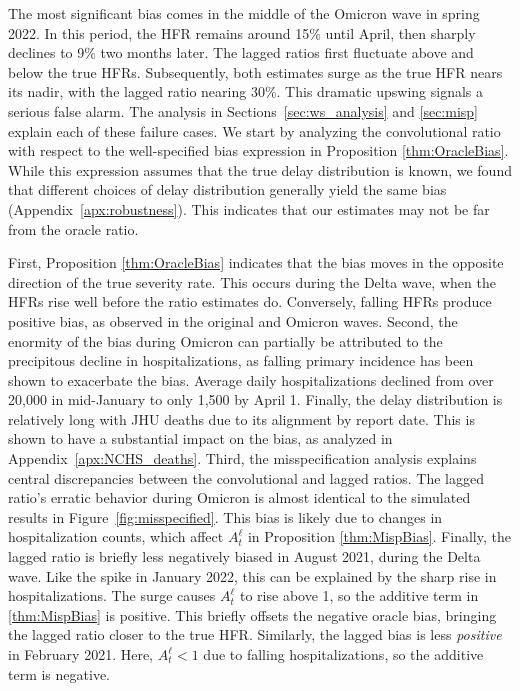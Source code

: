 \documentclass{article}
\begin{document}
The most significant bias comes in the middle of the Omicron wave in spring 2022. 
In this period, the HFR remains around 15\% until April, then sharply declines to 9\% two months later. The lagged ratios first fluctuate above and below the true HFRs. Subsequently, both estimates surge as the true HFR nears its nadir, with the lagged ratio nearing 30\%. This dramatic upswing signals a serious false alarm. 
The analysis in Sections~\ref{sec:ws_analysis} and \ref{sec:misp} explain each
of these failure cases. We start by analyzing the convolutional ratio with
respect to the well-specified bias expression in Proposition \ref{thm:OracleBias}.
While this expression assumes that the true delay distribution is known, we found
that different choices of delay distribution generally yield the same bias
(Appendix~\ref{apx:robustness}). This indicates that our estimates may not be far
from the oracle ratio.

First, Proposition \ref{thm:OracleBias} indicates that the bias moves in the opposite direction of the true severity rate. This occurs during the Delta wave, when the HFRs rise well before the ratio estimates do. Conversely, falling HFRs produce positive bias, as observed in the original and Omicron waves.
Second, the enormity of the bias during Omicron can partially be attributed to the precipitous decline in hospitalizations, as falling primary incidence has been shown to exacerbate the bias. Average daily hospitalizations declined from over 20,000 in mid-January to only 1,500 by April 1. 
Finally, the delay distribution is relatively long with JHU deaths due to its alignment by report date. This is shown to have a substantial impact on the bias, as analyzed in Appendix~\ref{apx:NCHS_deaths}.
Third, the misspecification analysis explains central discrepancies between the
convolutional and lagged ratios. The lagged ratio's erratic behavior during
Omicron is almost identical to the simulated results in
Figure~\ref{fig:misspecified}. This bias is likely due to changes in
hospitalization counts, which affect $A_t^\ell$ in Proposition \ref{thm:MispBias}.
Finally, the lagged ratio is briefly less negatively biased in August 2021, during the Delta wave. Like the spike in January 2022, this can be explained by the sharp rise in hospitalizations. The surge causes $A_t^\ell$ to rise above 1, so the additive term in \ref{thm:MispBias} is positive. This briefly offsets the negative oracle bias, bringing the lagged ratio closer to the true HFR. Similarly, the lagged bias is less \textit{positive} in February 2021. Here, $A_t^\ell < 1$ due to falling hospitalizations, so the additive term is negative. 
\end{document}
